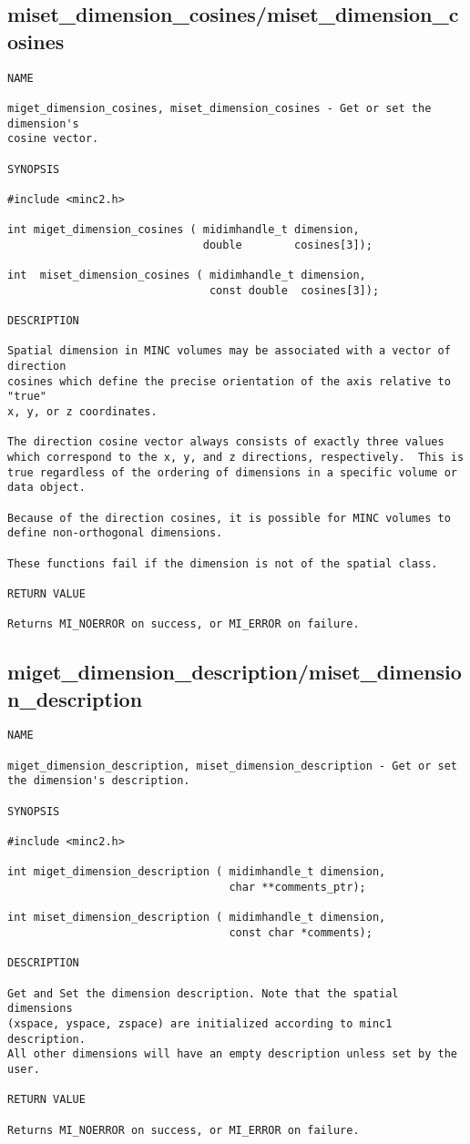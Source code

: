 \documentclass{article}
\begin{document}
\subsection{miset\_dimension\_cosines/miset\_dimension\_cosines}
\begin{verbatim}
NAME

miget_dimension_cosines, miset_dimension_cosines - Get or set the dimension's
cosine vector.

SYNOPSIS

#include <minc2.h>

int miget_dimension_cosines ( midimhandle_t dimension,
                              double        cosines[3]);

int  miset_dimension_cosines ( midimhandle_t dimension,
                               const double  cosines[3]);

DESCRIPTION

Spatial dimension in MINC volumes may be associated with a vector of direction
cosines which define the precise orientation of the axis relative to "true"
x, y, or z coordinates.

The direction cosine vector always consists of exactly three values
which correspond to the x, y, and z directions, respectively.  This is
true regardless of the ordering of dimensions in a specific volume or
data object.

Because of the direction cosines, it is possible for MINC volumes to
define non-orthogonal dimensions.

These functions fail if the dimension is not of the spatial class.

RETURN VALUE

Returns MI_NOERROR on success, or MI_ERROR on failure.
\end{verbatim}

\subsection{miget\_dimension\_description/miset\_dimension\_description}
\begin{verbatim}
NAME

miget_dimension_description, miset_dimension_description - Get or set the dimension's description.

SYNOPSIS

#include <minc2.h>

int miget_dimension_description ( midimhandle_t dimension,
                                  char **comments_ptr);

int miset_dimension_description ( midimhandle_t dimension,
                                  const char *comments);

DESCRIPTION

Get and Set the dimension description. Note that the spatial dimensions
(xspace, yspace, zspace) are initialized according to minc1 description.
All other dimensions will have an empty description unless set by the user.

RETURN VALUE

Returns MI_NOERROR on success, or MI_ERROR on failure.
\end{verbatim}
\end{document}
